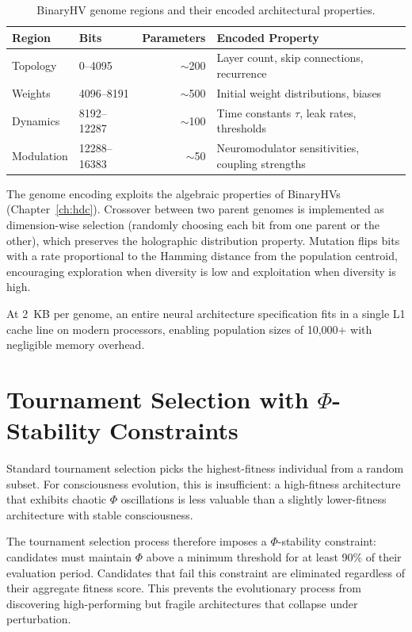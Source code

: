 \documentclass[12pt]{book}
\begin{document}
\begin{table}[htbp]
\centering
\caption{BinaryHV genome regions and their encoded architectural properties.}
\label{tab:genome-regions}
\begin{tabular}{@{}llrl@{}}
\toprule
\textbf{Region} & \textbf{Bits} & \textbf{Parameters} & \textbf{Encoded Property} \\
\midrule
Topology      & 0--4095       & $\sim$200 & Layer count, skip connections, recurrence \\
Weights       & 4096--8191    & $\sim$500 & Initial weight distributions, biases \\
Dynamics      & 8192--12287   & $\sim$100 & Time constants $\tau$, leak rates, thresholds \\
Modulation    & 12288--16383  & $\sim$50  & Neuromodulator sensitivities, coupling strengths \\
\bottomrule
\end{tabular}
\end{table}

The genome encoding exploits the algebraic properties of BinaryHVs (Chapter~\ref{ch:hdc}). Crossover between two parent genomes is implemented as dimension-wise selection (randomly choosing each bit from one parent or the other), which preserves the holographic distribution property. Mutation flips bits with a rate proportional to the Hamming distance from the population centroid, encouraging exploration when diversity is low and exploitation when diversity is high.

At 2~KB per genome, an entire neural architecture specification fits in a single L1 cache line on modern processors, enabling population sizes of 10,000+ with negligible memory overhead.

\section{Tournament Selection with $\Phi$-Stability Constraints}

Standard tournament selection picks the highest-fitness individual from a random subset. For consciousness evolution, this is insufficient: a high-fitness architecture that exhibits chaotic $\Phi$ oscillations is less valuable than a slightly lower-fitness architecture with stable consciousness.

The tournament selection process therefore imposes a $\Phi$-stability constraint: candidates must maintain $\Phi$ above a minimum threshold for at least 90\% of their evaluation period. Candidates that fail this constraint are eliminated regardless of their aggregate fitness score. This prevents the evolutionary process from discovering high-performing but fragile architectures that collapse under perturbation.
\end{document}
